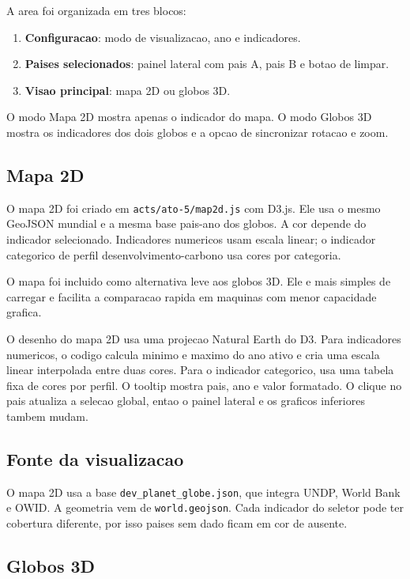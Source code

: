 \documentclass[12pt,a4paper]{article}
\begin{document}
A area foi organizada em tres blocos:

\begin{enumerate}
  \item \textbf{Configuracao}: modo de visualizacao, ano e indicadores.
  \item \textbf{Paises selecionados}: painel lateral com pais A, pais B e botao de limpar.
  \item \textbf{Visao principal}: mapa 2D ou globos 3D.
\end{enumerate}

O modo Mapa 2D mostra apenas o indicador do mapa. O modo Globos 3D mostra os indicadores dos dois globos e a opcao de sincronizar rotacao e zoom.

\subsection{Mapa 2D}

O mapa 2D foi criado em \texttt{acts/ato-5/map2d.js} com D3.js. Ele usa o mesmo GeoJSON mundial e a mesma base pais-ano dos globos. A cor depende do indicador selecionado. Indicadores numericos usam escala linear; o indicador categorico de perfil desenvolvimento-carbono usa cores por categoria.

O mapa foi incluido como alternativa leve aos globos 3D. Ele e mais simples de carregar e facilita a comparacao rapida em maquinas com menor capacidade grafica.

O desenho do mapa 2D usa uma projecao Natural Earth do D3. Para indicadores numericos, o codigo calcula minimo e maximo do ano ativo e cria uma escala linear interpolada entre duas cores. Para o indicador categorico, usa uma tabela fixa de cores por perfil. O tooltip mostra pais, ano e valor formatado. O clique no pais atualiza a selecao global, entao o painel lateral e os graficos inferiores tambem mudam.

\subsection{Fonte da visualizacao}

O mapa 2D usa a base \texttt{dev\_planet\_globe.json}, que integra UNDP, World Bank e OWID. A geometria vem de \texttt{world.geojson}. Cada indicador do seletor pode ter cobertura diferente, por isso paises sem dado ficam em cor de ausente.

\subsection{Globos 3D}
\end{document}
